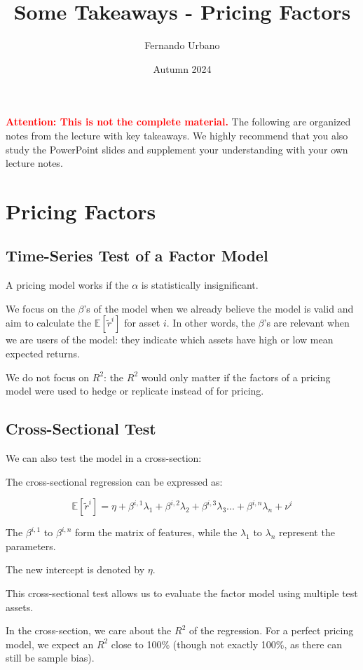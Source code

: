 \documentclass{article}
\title{Some Takeaways - Pricing Factors}
\author{Fernando Urbano}
\date{Autumn 2024}
\newcommand{\redbold}[1]{\textbf{\textcolor{red}{#1}}}
\begin{document}
\maketitle

\redbold{Attention: This is not the complete material.} The following are organized notes from the lecture with key takeaways. We highly recommend that you also study the PowerPoint slides and supplement your understanding with your own lecture notes.

\section{Pricing Factors}

\subsection{Time-Series Test of a Factor Model}
A pricing model works if the $\alpha$ is statistically insignificant.

We focus on the $\beta$'s of the model when we already believe the model is valid and aim to calculate the $\mathbb{E}[\tilde{r}^i]$ for asset $i$. In other words, the $\beta$'s are relevant when we are users of the model: they indicate which assets have high or low mean expected returns.

We do not focus on $R^2$: the $R^2$ would only matter if the factors of a pricing model were used to hedge or replicate instead of for pricing.

\subsection{Cross-Sectional Test}
We can also test the model in a cross-section:

The cross-sectional regression can be expressed as:

\[
\mathbb{E}[\tilde{r}^i]=\eta+\beta^{i, 1}\lambda_{1}+\beta^{i, 2}\lambda_{2}+\beta^{i, 3}\lambda_{3}...+\beta^{i, n}\lambda_{n}+\nu^i
\]

The $\beta^{i, 1}$ to $\beta^{i, n}$ form the matrix of features, while the $\lambda_{1}$ to $\lambda_{n}$ represent the parameters.

The new intercept is denoted by $\eta$.

This cross-sectional test allows us to evaluate the factor model using multiple test assets.

In the cross-section, we care about the $R^2$ of the regression. For a perfect pricing model, we expect an $R^2$ close to 100\% (though not exactly 100\%, as there can still be sample bias).
\end{document}
